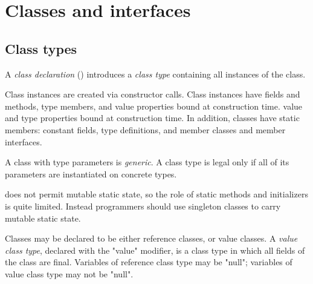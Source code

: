 \section{Classes and interfaces}
\label{ReferenceTypes}

\subsection{Class types}


        A {\em class declaration} ()
        introduces a 
        {\em class type}
        containing all instances of the class.

        Class instances are created via
        constructor calls.  Class instances have fields and
        methods, type members, and
\iftypeparams
        value properties bound at construction time.
\else
        value and type properties bound at construction time.
\fi
        In addition, classes have static
        members: constant fields, type definitions, and member
        classes and member interfaces.

\iftypeparams
        A class with type parameters is {\em generic}.  A class
        type is legal only if all of its parameters are instantiated
        on concrete types.
\fi

\Xten{} does
not
permit mutable static state, so the role of static methods and
initializers is quite limited. Instead programmers should use
singleton classes to carry mutable static state.



        Classes may be declared to be either reference classes,
        or value classes.
A \emph{value class type}, declared with the \xcd"value"
modifier,
is a class type in which all fields of the class are final.
%
Variables of reference class type may be \xcd"null"; 
variables of value class type may not be \xcd"null".


